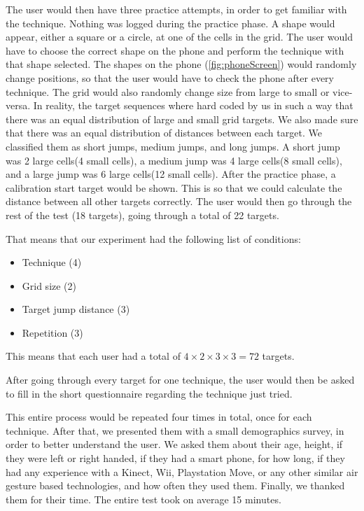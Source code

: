 The user would then have three practice attempts, in order to get familiar with the technique. 
Nothing was logged during the practice phase.
A shape would appear, either a square or a circle, at one of the cells in the grid. 
The user would have to choose the correct shape on the phone and perform the technique with that shape selected. 
The shapes on the phone (\cref{fig:phoneScreen}) would randomly change positions, so that the user would have to check the phone after every technique. 
The grid would also randomly change size from large to small or vice-versa. 
In reality, the target sequences where hard coded by us in such a way that there was an equal distribution of large and small grid targets. 
We also made sure that there was an equal distribution of distances between each target. We classified them as short jumps, medium jumps, and long jumps. 
A short jump was 2 large cells(4 small cells), a medium jump was 4 large cells(8 small cells), and a large jump was 6 large cells(12 small cells).  
After the practice phase, a calibration start target would be shown. This is so that we could calculate the distance between all other targets correctly. 
The user would then go through the rest of the test (18 targets), going through a total of 22 targets. 

That means that our experiment had the following list of conditions:
\begin{itemize}
	 \item Technique (4)
	 \item Grid size (2)
	 \item Target jump distance (3)
	 \item Repetition (3)
\end{itemize}

This means that each user had a total of $4 \times 2 \times 3 \times 3 = 72 $ targets.

After going through every target for one technique, the user would then be asked to fill in the short questionnaire regarding the technique just tried. 

This entire process would be repeated four times in total, once for each technique. 
After that, we presented them with a small demographics survey, in order to better understand the user. 
We asked them about their age, height, if they were left or right handed, if they had a smart phone, for how long, if they had any experience with a Kinect, Wii, Playstation Move, or any other similar air gesture based technologies, and how often they used them. 
Finally, we thanked them for their time.
The entire test took on average 15 minutes. 